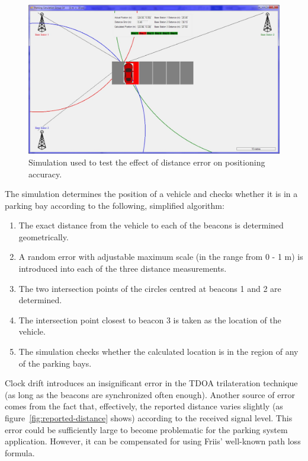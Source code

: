 \begin{figure}[H]
\begin{center}
\includegraphics[scale=0.3]{data/software/3.jpg}
\caption{Simulation used to test the effect of distance error on positioning accuracy.}
\label{fig:distance-error}
\end{center}
\end{figure}

The simulation determines the position of a vehicle and checks whether it is in a parking bay according to the following, simplified algorithm:

\begin{enumerate}
\item The exact distance from the vehicle to each of the beacons is determined geometrically.
\item A random error with adjustable maximum scale (in the range from 0 - 1 m) is introduced into each of the three distance measurements.
\item The two intersection points of the circles centred at beacons 1 and 2 are determined.
\item The intersection point closest to beacon 3 is taken as the location of the vehicle.
\item The simulation checks whether the calculated location is in the region of any of the parking bays.
\end{enumerate}

Clock drift introduces an insignificant error in the TDOA trilateration technique (as long as the beacons are synchronized often enough). Another source of error comes from the fact that, effectively, the reported distance varies slightly (as figure~\ref{fig:reported-distance} shows) according to the received signal level. This error could be sufficiently large to become problematic for the parking system application. However, it can be compensated for using Friis' well-known path loss formula.\cite{2}

